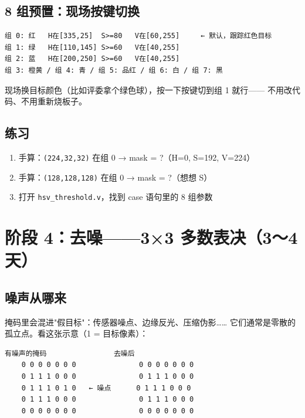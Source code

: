 \documentclass[11pt]{ctexart}
\newcommand{\code}[1]{\texttt{#1}}
\begin{document}
\subsection{8 组预置：现场按键切换}

\begin{Verbatim}[frame=single,fontsize=\small]
组 0: 红   H在[335,25]  S>=80   V在[60,255]     ← 默认，跟踪红色目标
组 1: 绿   H在[110,145] S>=60   V在[40,255]
组 2: 蓝   H在[200,250] S>=60   V在[40,255]
组 3: 橙黄 / 组 4: 青 / 组 5: 品红 / 组 6: 白 / 组 7: 黑
\end{Verbatim}

现场换目标颜色（比如评委拿个绿色球），按一下按键切到组 1 就行——
不用改代码、不用重新烧板子。

\subsection{练习}

\begin{enumerate}
  \item 手算：\code{(224,32,32)} 在组 0 → mask = ?（H=0, S=192, V=224）
  \item 手算：\code{(128,128,128)} 在组 0 → mask = ?（想想 S）
  \item 打开 \code{hsv\_threshold.v}，找到 case 语句里的 8 组参数
\end{enumerate}

\section{阶段 4：去噪——3×3 多数表决（3～4 天）}

\subsection{噪声从哪来}

掩码里会混进"假目标"：传感器噪点、边缘反光、压缩伪影……
它们通常是零散的孤立点。看这张示意（1 = 目标像素）：

\begin{Verbatim}[frame=single,fontsize=\small]
    有噪声的掩码                去噪后
    0 0 0 0 0 0 0               0 0 0 0 0 0 0
    0 1 1 1 0 0 0               0 1 1 1 0 0 0
    0 1 1 1 0 1 0   ← 噪点      0 1 1 1 0 0 0
    0 1 1 1 0 0 0               0 1 1 1 0 0 0
    0 0 0 0 0 0 0               0 0 0 0 0 0 0
\end{Verbatim}
\end{document}
